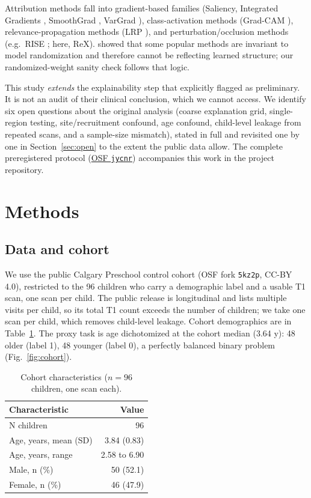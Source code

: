 \documentclass[11pt]{article}
\begin{document}
Attribution methods fall into gradient-based families (Saliency, Integrated Gradients
\citep{sundararajan2017}, SmoothGrad \citep{smilkov2017}, VarGrad \citep{adebayo2018}),
class-activation methods
(Grad-CAM \citep{selvaraju2017}), relevance-propagation methods (LRP \citep{bach2015}), and
perturbation/occlusion methods (e.g.\ RISE \citep{petsiuk2018}; here, ReX). \citet{adebayo2018}
showed that some popular methods are invariant to model randomization and therefore cannot be
reflecting learned structure; our randomized-weight sanity check follows that logic.

This study \emph{extends} the explainability step that \citet{das2024} explicitly flagged as
preliminary. It is not an audit of their clinical conclusion, which we cannot access. We
identify six open questions about the original analysis (coarse explanation grid,
single-region testing, site/recruitment confound, age confound, child-level leakage from
repeated scans, and a sample-size mismatch), stated in full and revisited one by one in
Section~\ref{sec:open} to the extent the public data allow. The complete preregistered protocol (\href{https://osf.io/jycnr}{OSF \texttt{jycnr}}) accompanies this work in the project repository.

\section{Methods}

\subsection{Data and cohort}
We use the public Calgary Preschool control cohort \citep{reynolds2020} (OSF fork
\texttt{5kz2p}, CC-BY 4.0), restricted to the 96 children who carry a demographic label and a
usable T1 scan, one scan per child. The public release is longitudinal and lists multiple
visits per child, so its total T1 count exceeds the number of children; we take one scan per
child, which removes child-level leakage. Cohort
demographics are in Table~\ref{tab:cohort}. The proxy task is age dichotomized at the cohort
median (3.64 y): 48 older (label 1), 48 younger (label 0), a perfectly balanced
binary problem (Fig.~\ref{fig:cohort}).

\begin{table}[H]
\centering
\caption{Cohort characteristics ($n=96$ children, one scan each).}
\label{tab:cohort}
\begin{tabular}{lr}
\toprule
Characteristic & Value \\
\midrule
N children & 96 \\
Age, years, mean (SD) & 3.84 (0.83) \\
Age, years, range & 2.58 to 6.90 \\
Male, n (\%) & 50 (52.1) \\
Female, n (\%) & 46 (47.9) \\
\bottomrule
\end{tabular}
\end{table}
\end{document}
